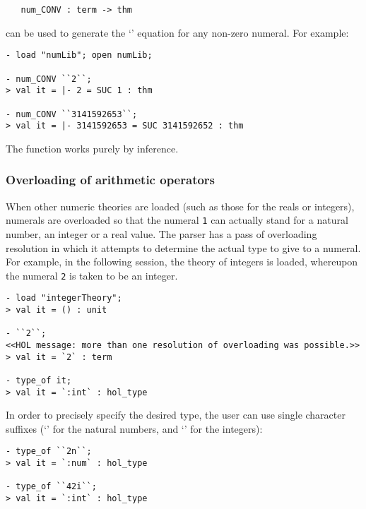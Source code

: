 \begin{boxed}
\begin{verbatim}
   num_CONV : term -> thm
\end{verbatim}
\end{boxed}

\noindent {} can be used to generate the `'
equation for any non-zero numeral.  For example:

\begin{boxed}
\begin{verbatim}
- load "numLib"; open numLib;

- num_CONV ``2``;
> val it = |- 2 = SUC 1 : thm

- num_CONV ``3141592653``;
> val it = |- 3141592653 = SUC 3141592652 : thm
\end{verbatim}
\end{boxed}

\noindent The  function works purely by inference.

\subsubsection{Overloading of arithmetic operators}
\label{arith-overloading}

When other numeric theories are loaded (such as those for the reals or
integers), numerals are overloaded so that the numeral {\small\verb+1+} can
actually stand for a natural number, an integer or a real value. The
parser has a pass of overloading resolution in which it attempts to
determine the actual type to give to a numeral. For example, in the
following session, the theory of integers is loaded, whereupon the
numeral \verb+2+ is taken to be an integer.
%
\setcounter{sessioncount}{0}
\begin{session}
{\small
\begin{verbatim}
- load "integerTheory";
> val it = () : unit

- ``2``;
<<HOL message: more than one resolution of overloading was possible.>>
> val it = `2` : term

- type_of it;
> val it = `:int` : hol_type
\end{verbatim}
}
\end{session}

 In order to precisely specify the desired type, the user can use single
character suffixes (`' for the natural numbers, and `' for
the integers):
\begin{session}
{\small
\begin{verbatim}
- type_of ``2n``;
> val it = `:num` : hol_type

- type_of ``42i``;
> val it = `:int` : hol_type
\end{verbatim}
}
\end{session}

